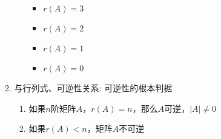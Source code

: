 \documentclass[a4paper,12pt]{article}
\begin{document}
\begin{enumerate}
\begin{enumerate}
\begin{enumerate}
                \begin{itemize}
                    \item $r(A) = 3$ \Rightarrow {}
                    \item $r(A) = 2$ \Rightarrow {}
                    \item $r(A) = 1$ \Rightarrow {}
                    \item $r(A) = 0$ \Rightarrow {}
                \end{itemize}
            \end{enumerate}
            \item 与行列式、可逆性关系: 可逆性的根本判据
            \begin{enumerate}
                \item 如果$n$阶矩阵$A$，$r(A) = n$，那么$A$可逆，$|A| \neq 0$
                \item 如果$r(A) < n$，矩阵$A$不可逆
            \end{enumerate}
        \end{enumerate}
    \end{enumerate}
\end{document}
